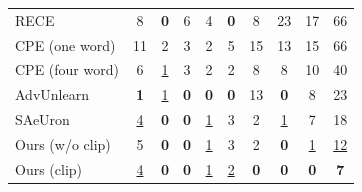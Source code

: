 \begin{table}
{\begin{tabular}{lccccccccc}
RECE \cite{DBLP:conf/eccv/GongCWCJ24}  & 8    & \textbf{0}   & 6 & 4 & \textbf{0}    & 8 & 23   & 17  & 66    \\
CPE (one word) \cite{lee2024cpe}   & 11    & 2   & 3 & 2  & 5   & 15 & 13    & 15  & 66    \\
CPE (four word) \cite{lee2024cpe} & 6    & \underline{1}   & 3  & 2 & 2   & 8 & 8    & 10 & 40    \\
AdvUnlearn \cite{zhang2024defensive} & \textbf{1} & \underline{1} & \textbf{0} & \textbf{0} & \textbf{0} & 13  & \textbf{0} & 8 & 23 \\
SAeUron \cite{cywinski2025saeuron}    & \underline{4}    & \textbf{0}   & \textbf{0}  & \underline{1}  & 3    &  2 & \underline{1}    & 7  & 18    \\
Ours (w/o clip)   & 5    & \textbf{0}   & \textbf{0}         & \underline{1}            & 3    & 2 & \textbf{0}    & \underline{1}          & \underline{12} \\
Ours (clip)   & \underline{4}    & \textbf{0}   & \textbf{0}         & \underline{1}            & \underline{2}    & \textbf{0} & \textbf{0}    & \textbf{0}          & \textbf{7} \\\bottomrule
\end{tabular}
}

\label{tab:sd14_nudity}
\end{table}